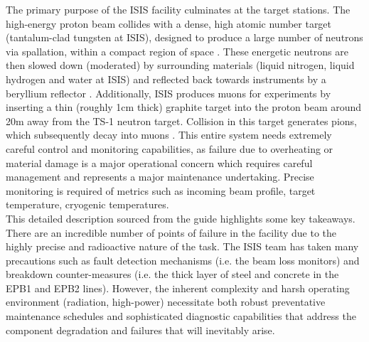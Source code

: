 \documentclass[10pt,oneside]{report}
\begin{document}
The primary purpose of the ISIS facility culminates at the target stations. The high-energy proton beam collides with a dense, high atomic number target (tantalum-clad tungsten at ISIS), designed to produce a large number of neutrons via spallation, within a compact region of space \cite{2021practicalguide}. These energetic neutrons are then slowed down (moderated) by surrounding materials (liquid nitrogen, liquid hydrogen and water at ISIS) and reflected back towards instruments by a beryllium reflector \cite{sharma2001nuclear, 2021practicalguide}. Additionally, ISIS produces muons for experiments by inserting a thin (roughly 1cm thick) graphite target into the proton beam around 20m away from the TS-1 neutron target. Collision in this target generates pions, which subsequently decay into muons \cite{2021practicalguide}.
This entire system needs extremely careful control and monitoring capabilities, as failure due to overheating or material damage is a major operational concern which requires careful management and represents a major maintenance undertaking. Precise monitoring is required of metrics such as incoming beam profile, target temperature, cryogenic temperatures. \\

\noindent This detailed description sourced from the guide highlights some key takeaways. There are an incredible number of points of failure in the facility due to the highly precise and radioactive nature of the task. The ISIS team has taken many precautions such as fault detection mechanisms (i.e. the beam loss monitors) and breakdown counter-measures (i.e. the thick layer of steel and concrete in the EPB1 and EPB2 lines). However, the inherent complexity and harsh operating environment (radiation, high-power) necessitate both robust preventative maintenance schedules and sophisticated diagnostic capabilities that address the component degradation and failures that will inevitably arise. 
\end{document}
